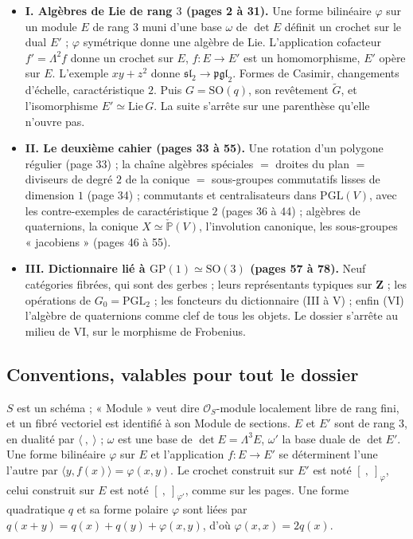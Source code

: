 \documentclass[11pt,a4paper]{article}
\begin{document}
\begin{itemize}
  \item \textbf{I. Algèbres de Lie de rang $3$ (pages 2 à 31).} Une forme
    bilinéaire $\varphi$ sur un module $E$ de rang $3$ muni d'une base $\omega$ de
    $\det E$ définit un crochet sur le dual $E'$ ; $\varphi$ symétrique donne une
    algèbre de Lie. L'application cofacteur $f' = \Lambda^2 f$ donne un crochet
    sur $E$, $f : E \to E'$ est un homomorphisme, $E'$ opère sur $E$. L'exemple
    $xy + z^2$ donne $\mathfrak{sl}_2 \to \mathfrak{pgl}_2$. Formes de Casimir,
    changements d'échelle, caractéristique $2$. Puis $G = \mathrm{SO}(q)$, son
    revêtement $\widetilde{G}$, et l'isomorphisme $E' \simeq \mathrm{Lie}\, G$.
    La suite s'arrête sur une parenthèse qu'elle n'ouvre pas.
  \item \textbf{II. Le deuxième cahier (pages 33 à 55).} Une rotation d'un
    polygone régulier (page 33) ; la chaîne algèbres spéciales $=$ droites du plan
    $=$ diviseurs de degré $2$ de la conique $=$ sous-groupes commutatifs lisses
    de dimension $1$ (page 34) ; commutants et centralisateurs dans
    $\mathrm{PGL}(V)$, avec les contre-exemples de caractéristique $2$ (pages 36
    à 44) ; algèbres de quaternions, la conique $X \simeq \check{\mathbb{P}}(V)$,
    l'involution canonique, les sous-groupes « jacobiens » (pages 46 à 55).
  \item \textbf{III. Dictionnaire lié à $\mathrm{GP}(1) \simeq \mathrm{SO}(3)$
    (pages 57 à 78).} Neuf catégories fibrées, qui sont des gerbes ; leurs
    représentants typiques sur $\mathbf{Z}$ ; les opérations de
    $G_0 = \mathrm{PGL}_2$ ; les foncteurs du dictionnaire (III à V) ; enfin (VI)
    l'algèbre de quaternions comme clef de tous les objets. Le dossier s'arrête
    au milieu de VI, sur le morphisme de Frobenius.
\end{itemize}

\subsection*{Conventions, valables pour tout le dossier}

$S$ est un schéma ; « Module » veut dire $\mathcal{O}_S$-module localement libre
de rang fini, et un fibré vectoriel est identifié à son Module de sections.
$E$ et $E'$ sont de rang $3$, en dualité par $\langle\ ,\ \rangle$ ; $\omega$ est
une base de $\det E = \Lambda^3 E$, $\omega'$ la base duale de $\det E'$.
Une forme bilinéaire $\varphi$ sur $E$ et l'application $f : E \to E'$ se
déterminent l'une l'autre par $\langle y, f(x) \rangle = \varphi(x, y)$. Le
crochet construit sur $E'$ est noté $[\ ,\ ]_{\varphi}$, celui construit sur $E$
est noté $[\ ,\ ]_{\varphi'}$, comme sur les pages. Une forme quadratique $q$ et
sa forme polaire $\varphi$ sont liées par $q(x + y) = q(x) + q(y) + \varphi(x, y)$,
d'où $\varphi(x, x) = 2q(x)$.
\end{document}
